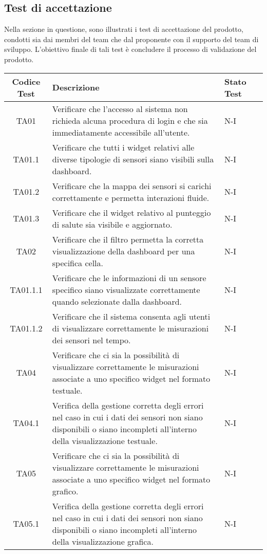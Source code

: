 \subsection{Test di accettazione}
Nella sezione in questione, sono illustrati i test di accettazione del prodotto, condotti sia dai membri del team che dal proponente con il supporto del team di sviluppo. L'obiettivo finale di tali test è concludere il processo di validazione del prodotto.
\\
\begin{longtable}{|c|p{5cm}|p{2cm}|c|}
    \hline
    Codice Test & Descrizione & Stato Test \\
    \hline
    TA01 & Verificare che l'accesso al sistema non richieda alcuna procedura di login e che sia immediatamente accessibile all'utente. & N-I \\
    \hline
    TA01.1 & Verificare che tutti i widget relativi alle diverse tipologie di sensori siano visibili sulla dashboard. & N-I \\
    \hline
    TA01.2 & Verificare che la mappa dei sensori si carichi correttamente e permetta interazioni fluide. & N-I \\
    \hline
    TA01.3 & Verificare che il widget relativo al punteggio di salute sia visibile e aggiornato. & N-I \\
    \hline
    TA02 & Verificare che il filtro permetta la corretta visualizzazione della dashboard per una specifica cella. & N-I \\
    \hline
    TA01.1.1 & Verificare che le informazioni di un sensore specifico siano visualizzate correttamente quando selezionate dalla dashboard. & N-I \\
    \hline
    TA01.1.2 & Verificare che il sistema consenta agli utenti di visualizzare correttamente le misurazioni dei sensori nel tempo. & N-I \\
    \hline
    TA04 & Verificare che ci sia la possibilità di visualizzare correttamente le misurazioni associate a uno specifico widget nel formato testuale.  & N-I \\
    \hline
    TA04.1 & Verifica della gestione corretta degli errori nel caso in cui i dati dei sensori non siano disponibili o siano incompleti all'interno della visualizzazione testuale. & N-I \\
    \hline
    TA05 & Verificare che ci sia la possibilità di visualizzare correttamente le misurazioni associate a uno specifico widget nel formato grafico. & N-I \\
    \hline
    TA05.1 & Verifica della gestione corretta degli errori nel caso in cui i dati dei sensori non siano disponibili o siano incompleti all'interno della visualizzazione grafica. & N-I \\

\end{longtable}
